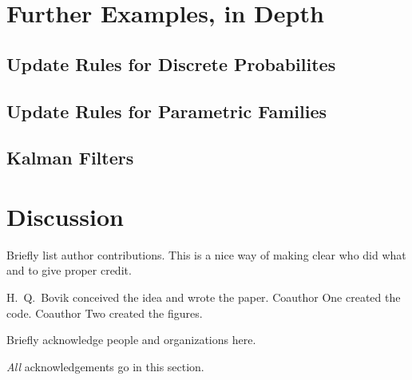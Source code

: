 \documentclass{uai2023} %
\begin{document}
\section{Further Examples, in Depth}
\subsection{Update Rules for Discrete Probabilites}

\subsection{Update Rules for Parametric Families}

\subsection{Kalman Filters}

\section{Discussion}



\begin{contributions} %
    Briefly list author contributions.
    This is a nice way of making clear who did what and to give proper credit.

    H.~Q.~Bovik conceived the idea and wrote the paper.
    Coauthor One created the code.
    Coauthor Two created the figures.
\end{contributions}

\begin{acknowledgements} %
    Briefly acknowledge people and organizations here.

    \emph{All} acknowledgements go in this section.
\end{acknowledgements}

\ifbiblatex
    \printbibliography
\else
    
\fi

\appendix
\onecolumn

\end{document}
